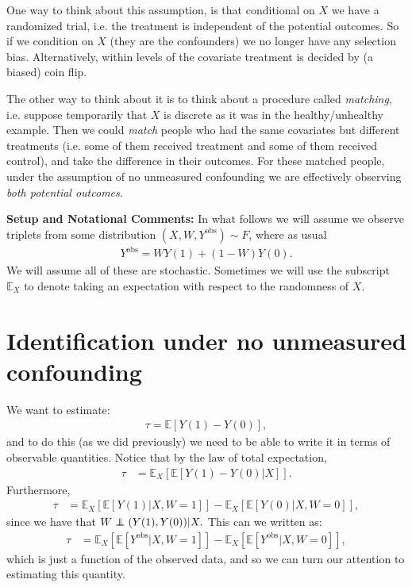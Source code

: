 \documentclass[twoside,12pt]{article}
\begin{document}
One way to think about this assumption, is that conditional on $X$ we have a randomized trial, i.e. the treatment is independent of the potential outcomes. So if we condition on $X$ (they are the confounders) we no longer have any selection bias. Alternatively, within levels of the covariate treatment is decided by (a biased) coin flip.

The other way to think about it is to think about a procedure called \emph{matching}, i.e. suppose temporarily that $X$ is discrete as it was in the healthy/unhealthy example. Then we could \emph{match} people who had the same covariates but different treatments (i.e. some of them received treatment and some of them received control), and take the difference in their outcomes. For these matched people, under the assumption of no unmeasured confounding we are effectively observing \emph{both potential outcomes}.

{\bf Setup and Notational Comments: } In what follows we will assume we observe triplets from some distribution $(X,W,Y^{\text{obs}}) \sim F$, where as usual
\begin{align*}
Y^{\text{obs}} = WY(1) + (1-W)Y(0).
\end{align*}
We will assume all of these are stochastic. Sometimes we will use the subscript $\mathbb{E}_X$ to denote taking an expectation with respect to the randomness of $X$.

\section{Identification under no unmeasured confounding}
We want to estimate:
\begin{align*}
\tau = \mathbb{E}[Y(1) - Y(0)],
\end{align*}
and to do this (as we did previously) we need to be able to write it in terms of observable quantities. Notice that by the law of total expectation,
\begin{align*}
\tau &= \mathbb{E}_X[\mathbb{E} [Y(1) - Y(0) | X ]].
\end{align*}
Furthermore,
\begin{align*}
\tau &=  \mathbb{E}_X[\mathbb{E} [Y(1) | X, W = 1]] -  \mathbb{E}_X[\mathbb{E} [ Y(0) | X, W = 0]],
\end{align*}
since we have that $W \independent (Y(1),Y(0)) | X.$ This can we written as:
\begin{align*}
\tau &=   \mathbb{E}_X[\mathbb{E} [Y^{\text{obs}} | X, W = 1]] -  \mathbb{E}_X[\mathbb{E} [Y^{\text{obs}}  | X, W = 0]],
\end{align*}
which is just a function of the observed data, and so we can turn our attention to estimating this quantity.
\end{document}
